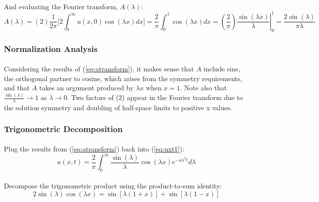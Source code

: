 \paragraph{}
And evaluating the Fourier transform, $A(\lambda)$:
\begin{equation}
\label{eq:atransform}
A(\lambda) = (2)\frac{1}{2\pi} \bigg[ 2\int_{0}^{\infty} u(x,0) \cos(\lambda x) dx \bigg] = \frac{2}{\pi} \int_{0}^{1} \cos(\lambda x) dx = ( \frac{2}{\pi} ) \left. \frac{\sin(\lambda x)}{\lambda} \right|_0^1 = \frac{2\sin(\lambda)}{\pi\lambda}
\end{equation}
\subsubsection*{Normalization Analysis}
\paragraph{}
Considering the results of (\ref{eq:atransform}), it makes sense that $A$ include sine, the orthogonal partner to cosine, which arises from the symmetry requirements, and that $A$ takes an argument produced by $\lambda x$ when $x = 1$. Note also that $\frac{\sin(\lambda)}{\lambda} \to 1$ as $\lambda \to 0$. Two factors of (2) appear in the Fourier transform due to the solution symmetry and doubling of half-space limits to positive x values.

\subsubsection*{Trigonometric Decomposition}
\paragraph{}
Plug the results from (\ref{eq:atransform}) back into (\ref{eq:uxt1}):
\begin{equation}
\label{eq:uxt2}
u(x,t) = \frac{2}{\pi} \int_{0}^{\infty} \frac{\sin(\lambda)}{\lambda} \cos(\lambda x) e^{-a\lambda^2 t} d\lambda
\end{equation}
\paragraph{}
Decompose the trigonometric product using the product-to-sum identity:
\begin{equation*}
2 \sin(\lambda)\cos(\lambda x) = \sin\left[\lambda(1+x)\right] + \sin\left[\lambda(1-x)\right]
\end{equation*}
